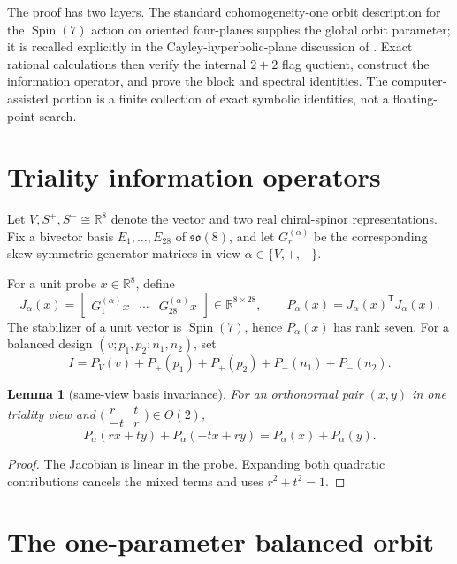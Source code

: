 \documentclass[11pt]{amsart}
\newtheorem{lemma}[theorem]{Lemma}
\theoremstyle{remark}
\DeclareMathOperator{\Spin}{Spin}
\begin{document}
The proof has two layers.  The standard cohomogeneity-one orbit description
for the $\Spin(7)$ action on oriented four-planes supplies the global orbit
parameter; it is recalled explicitly in the Cayley-hyperbolic-plane discussion
of \cite[Section~4]{BerndtTamaru2007}.  Exact rational calculations then verify
the internal $2+2$ flag quotient, construct the information operator, and
prove the block and spectral identities.  The computer-assisted portion is a
finite collection of exact symbolic identities, not a floating-point search.

\section{Triality information operators}

Let $V,S^+,S^-\cong\mathbb R^8$ denote the vector and two real chiral-spinor
representations.  Fix a bivector basis $E_1,\dots,E_{28}$ of
$\mathfrak{so}(8)$, and let $G_r^{(\alpha)}$ be the corresponding
skew-symmetric generator matrices in view $\alpha\in\{V,+,-\}$.

For a unit probe $x\in\mathbb R^8$, define
\[
 J_\alpha(x)
 =\begin{bmatrix}G_1^{(\alpha)}x&\cdots&G_{28}^{(\alpha)}x\end{bmatrix}
 \in\mathbb R^{8\times28},
 \qquad
 P_\alpha(x)=J_\alpha(x)^{\mathsf T}J_\alpha(x).
\]
The stabilizer of a unit vector is $\Spin(7)$, hence $P_\alpha(x)$ has rank
seven.  For a balanced design $(v;p_1,p_2;n_1,n_2)$, set
\[
 I=P_V(v)+P_+(p_1)+P_+(p_2)+P_-(n_1)+P_-(n_2).
\]

\begin{lemma}[same-view basis invariance]\label{lem:basis-invariance}
For an orthonormal pair $(x,y)$ in one triality view and
$\bigl(\begin{smallmatrix}r&t\\-t&r\end{smallmatrix}\bigr)\in O(2)$,
\[
 P_\alpha(rx+ty)+P_\alpha(-tx+ry)
 =P_\alpha(x)+P_\alpha(y).
\]
\end{lemma}

\begin{proof}
The Jacobian is linear in the probe.  Expanding both quadratic contributions
cancels the mixed terms and uses $r^2+t^2=1$.
\end{proof}

\section{The one-parameter balanced orbit}
\end{document}

